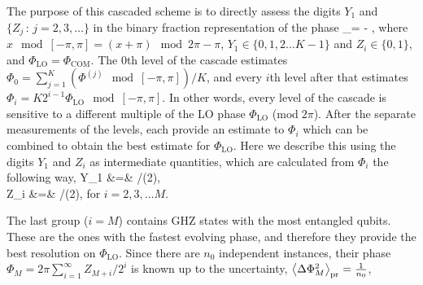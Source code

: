 The purpose of this cascaded scheme is to directly assess the digits $Y_1$ and
$\{Z_j\,:\, j=2,3,\dots\}$ in the binary fraction representation of the phase
\bel
	\Phi_\mod[-\pi,\pi] = \left[Y_1 +\sum_{i=1}^\infty
	Z_{i+1}/2^i\right] - \pi,
\eel
where $x \mod [-\pi, \pi] = (x+\pi) \mod 2\pi - \pi$, $Y_1\in\{0,1,2\dots K-1\}$
and $Z_i\in\{0,1\}$, and $\Phi_\mathrm{LO} = \Phi_\mathrm{COM}$. The $0$th level of
the cascade estimates $\Phi_0 =
\sum_{j=1}^K \left(\Phi^{(j)}\mod[-\pi,\pi]\right)/K$, and every $i$th
level after that estimates $\Phi_i = K2^{i-1}\Phi_\mathrm{LO} \mod [-\pi,\pi]$. 
In other words, every level of the cascade is sensitive to a different
multiple of the LO phase $\Phi_\mathrm{LO}$ ($\mathrm{mod}\; 2\pi$). After the
separate measurements of the levels, each provide an estimate to $\Phi_i$ which
can be combined to obtain the best estimate for $\Phi_\mathrm{LO}$. Here we
describe this using the digits $Y_1$ and $Z_i$ as intermediate quantities,
which are calculated from $\Phi_i$ the following way,
% 
% 
\bal
	Y_1 &=& /(2\pi),
	\\
	Z_i &=& /(2\pi),
\eal 
for $i=2,3, \dots M$. 


The last group ($i=M$) contains GHZ states with the most entangled qubits.
These are the ones with the fastest evolving phase, and therefore they provide
the best resolution on $\Phi_\mathrm{LO}$. Since
there are $n_0$ independent instances, their phase $\Phi_{M} = 2\pi \sum_{i=1}^\infty Z_{M+i}/2^i$ is known
up to the uncertainty, $\left< \Delta\Phi^2_{M} \right>_\mathrm{pr} =
\frac{1}{n_0}$, 

